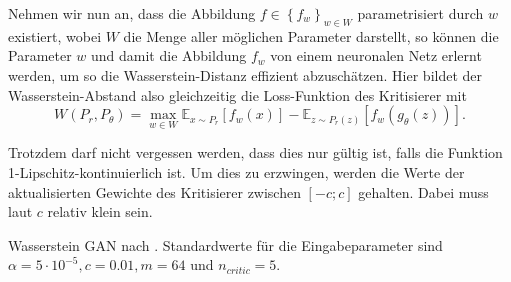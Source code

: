 Nehmen wir nun an, dass die Abbildung $f \in \left\{f_w\right\}_{w \in W}$
parametrisiert durch $w$ existiert, wobei $W$ die Menge aller möglichen
Parameter darstellt, so können die Parameter $w$ und damit die Abbildung $f_w$
von einem neuronalen Netz erlernt werden, um so die Wasserstein-Distanz
effizient abzuschätzen. Hier bildet der Wasserstein-Abstand also gleichzeitig
die Loss-Funktion des Kritisierer mit
\[
W(P_r, P_\theta) = \max_{w \in W} \mathbb{E}_{x \sim P_r}\left[f_w(x)\right]
- \mathbb{E}_{z \sim P_r(z)}\left[f_w(g_\theta(z))\right].
\]

Trotzdem darf nicht vergessen werden, dass dies nur gültig ist, falls die
Funktion 1-Lipschitz-kontinuierlich ist. Um dies zu erzwingen, werden die
Werte der aktualisierten Gewichte des Kritisierer zwischen $\left[-c; c\right]$
gehalten. Dabei muss laut \cite{arjovsky2017wasserstein} $c$ relativ klein
sein.

\begin{algorithm}
\SetAlgoLined
{}
\caption{Wasserstein GAN nach \cite{arjovsky2017wasserstein}. Standardwerte
für die Eingabeparameter sind $\alpha = 5\cdot10^{-5}, c = 0.01, m = 64$
und $n_{critic} = 5$.}
\label{alg:wgan}
\BlankLine

\end{algorithm}

